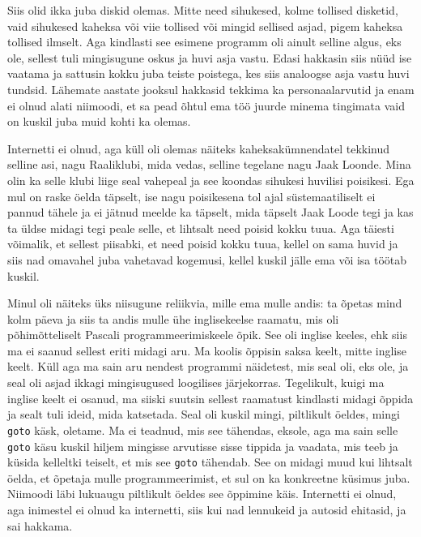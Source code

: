 
Siis olid ikka juba diskid olemas. Mitte need sihukesed, kolme tollised 
disketid, vaid sihukesed  kaheksa või viie tollised või mingid sellised asjad, 
pigem kaheksa tollised ilmselt. Aga kindlasti see esimene programm oli ainult 
selline algus, eks ole, sellest tuli mingisugune  oskus ja huvi asja vastu. 
Edasi hakkasin siis nüüd ise vaatama ja  sattusin kokku juba teiste poistega, 
kes siis analoogse asja vastu huvi tundsid. Lähemate aastate jooksul hakkasid 
tekkima ka personaalarvutid ja enam ei olnud alati niimoodi, et sa pead õhtul 
ema töö juurde minema tingimata vaid on kuskil juba muid kohti ka olemas.


Internetti ei olnud, aga küll oli olemas näiteks kaheksakümnendatel tekkinud 
selline asi, nagu Raaliklubi, mida vedas, selline tegelane 
nagu Jaak Loonde. Mina olin ka selle klubi liige seal 
vahepeal ja see koondas sihukesi huvilisi poisikesi. Ega mul on raske öelda 
täpselt,  ise nagu poisikesena tol ajal süstemaatiliselt ei pannud tähele ja ei 
jätnud meelde ka täpselt, mida täpselt Jaak Loode tegi ja kas ta üldse midagi 
tegi peale selle, et lihtsalt need poisid kokku tuua. Aga täiesti võimalik, et 
sellest piisabki, et need poisid kokku tuua, kellel on sama huvid ja siis nad 
omavahel juba vahetavad kogemusi, kellel kuskil jälle ema või isa töötab 
kuskil. 

Minul oli näiteks üks niisugune reliikvia, mille ema mulle andis: ta õpetas 
mind kolm päeva ja siis ta andis mulle ühe inglisekeelse raamatu, mis oli 
põhimõtteliselt Pascali programmeerimiskeele õpik. See oli inglise keeles, ehk 
siis ma ei saanud sellest eriti midagi aru. Ma koolis õppisin saksa keelt, 
mitte inglise keelt. Küll aga ma sain aru 
nendest  programmi näidetest, mis seal oli, eks ole, ja seal oli asjad ikkagi 
mingisugused loogilises  järjekorras. Tegelikult, kuigi ma inglise keelt ei 
osanud, ma siiski suutsin sellest raamatust kindlasti midagi õppida ja sealt 
tuli ideid, mida katsetada. Seal oli kuskil mingi, piltlikult öeldes, mingi 
\verb|goto| käsk, oletame. Ma ei teadnud, mis see tähendas, eksole, aga ma sain 
selle \verb|goto| käsu kuskil hiljem mingisse arvutisse sisse tippida ja 
vaadata, mis teeb ja küsida kelleltki teiselt, et mis see \verb|goto| tähendab. 
See on midagi muud kui lihtsalt öelda, et õpetaja mulle programmeerimist, et 
sul on ka konkreetne küsimus juba. Niimoodi läbi lukuaugu piltlikult öeldes see 
õppimine käis. Internetti ei olnud, aga  inimestel ei olnud ka internetti, siis 
kui nad  lennukeid ja autosid ehitasid, ja sai hakkama.

